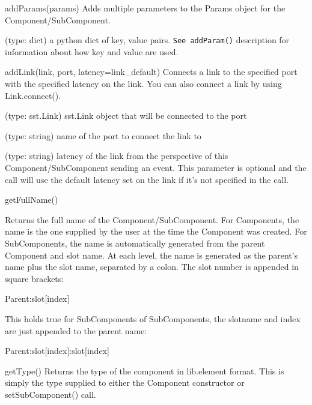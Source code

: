\begin{functiondoc}{addParams(params)}
  { Adds multiple parameters to the Params object for the Component/SubComponent.}

   (type: dict) a python dict of key, value pairs.
  \lstinline{See addParam()} description for information about how key
  and value are used.

\noreturn
\end{functiondoc}

\begin{functiondoc}{addLink(link, port, latency=link_default)}
  { Connects a link to the specified port with the specified latency
    on the link.  You can also connect a link by using Link.connect().}

   (type: sst.Link) sst.Link object that will be connected
  to the port

   (type: string) name of the port to connect the link to

   (type: string) latency of the link from the
  perspective of this Component/SubComponent sending an event.  This
  parameter is optional and the call will use the default latency set
  on the link if it’s not specified in the call.

\noreturn
\end{functiondoc}

\begin{functiondoc}{getFullName()}
  { Returns the full name of the Component/SubComponent.  For
    Components, the name is the one supplied by the user at the time
    the Component was created.  For SubComponents, the name is
    automatically generated from the parent Component and slot name.
    At each level, the name is generated as the parent's name plus the
    slot name, separated by a colon.  The slot number is appended in
    square brackets:

    Parent:slot[index]

    This holds true for SubComponents of SubComponents, the slotname
    and index are just appended to the parent name:

    Parent:slot[index]:slot[index]
  }
\end{functiondoc}


\begin{functiondoc}{getType()}
  { Returns the type of the component in lib.element format.  This is
    simply the type supplied to either the Component constructor or
    setSubComponent() call. }

\end{functiondoc}


